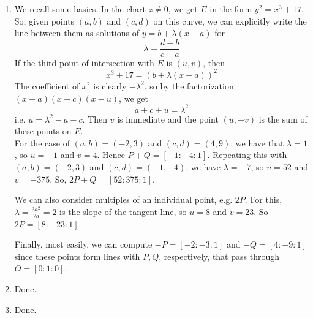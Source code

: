 \documentclass{article}
\begin{document}
\begin{enumerate}
	\item We recall some basics. In the chart $z \neq 0$, we get $E$ in the form $y^2 = x^3+17$. So, given points $(a,b)$ and $(c,d)$ on this curve, we can explicitly write the line between them as solutions of $y = b+\lambda(x-a)$ for
	\[ \lambda = \frac{d-b}{c-a} \]
	If the third point of intersection with $E$ is $(u,v)$, then
	\[ x^3 + 17 = (b+\lambda(x-a))^2 \]
	The coefficient of $x^2$ is clearly $-\lambda^2$, so by the factorization $(x-a)(x-c)(x-u)$, we get
	\[ a+c+u = \lambda^2 \]
	i.e. $u = \lambda^2-a-c$. Then $v$ is immediate and the point $(u,-v)$ is the sum of these points on $E$. \\
	
	For the case of $(a,b) = (-2,3)$ and $(c,d) = (4,9)$, we have that $\lambda = 1$, so $u = -1$ and $v = 4$. Hence $P+Q = [-1:-4:1]$. Repeating this with $(a,b)=(-2,3)$ and $(c,d)=(-1,-4)$, we have $\lambda = -7$, so $u = 52$ and $v = -375$. So, $2P+Q = [52:375:1]$.
	
	We can also consider multiples of an individual point, e.g. $2P$. For this, $\lambda = \frac{3a^2}{2b} = 2$ is the slope of the tangent line, so $u = 8$ and $v = 23$. So $2P = [8:-23:1]$.
	
	Finally, most easily, we can compute $-P = [-2:-3:1]$ and $-Q=[4:-9:1]$ since these points form lines with $P,Q$, respectively, that pass through $O = [0:1:0]$.
	
	\item Done.
	
	\item Done.
\end{enumerate}
\end{document}

